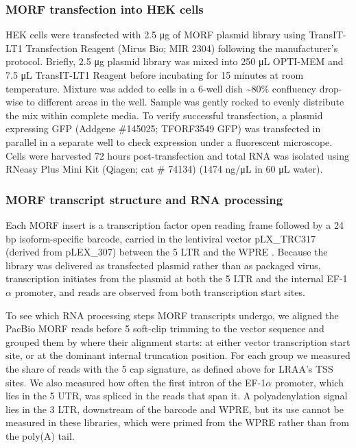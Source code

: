 \subsubsection{MORF transfection into HEK cells}\label{morf-transfection-into-hek-cells}

HEK cells were transfected with 2.5 μg of MORF plasmid library using TransIT-LT1 Transfection Reagent (Mirus Bio; MIR 2304) following the manufacturer's protocol. Briefly, 2.5 μg plasmid library was mixed into 250 μL OPTI-MEM and 7.5 μL TransIT-LT1 Reagent before incubating for 15 minutes at room temperature. Mixture was added to cells in a 6-well dish \textasciitilde80\% confluency drop-wise to different areas in the well. Sample was gently rocked to evenly distribute the mix within complete media. To verify successful transfection, a plasmid expressing GFP (Addgene \#145025; TFORF3549 GFP) was transfected in parallel in a separate well to check expression under a fluorescent microscope. Cells were harvested 72 hours post-transfection and total RNA was isolated using RNeasy Plus Mini Kit (Qiagen; cat \# 74134) (1474 ng/μL in 60 μL water).

\subsubsection{MORF transcript structure and RNA processing}\label{morf-transcript-structure-and-rna-processing}

Each MORF insert is a transcription factor open reading frame followed by a 24 bp isoform-specific barcode, carried in the lentiviral vector pLX\_TRC317 (derived from pLEX\_307) between the 5\p{} LTR and the WPRE \citep{joung2023}. Because the library was delivered as transfected plasmid rather than as packaged virus, transcription initiates from the plasmid at both the 5\p{} LTR and the internal EF-1$\alpha$ promoter, and reads are observed from both transcription start sites.

To see which RNA processing steps MORF transcripts undergo, we aligned the PacBio MORF reads before 5\p{} soft-clip trimming to the vector sequence and grouped them by where their alignment starts: at either vector transcription start site, or at the dominant internal truncation position. For each group we measured the share of reads with the 5\p{} cap signature, as defined above for LRAA's TSS sites. We also measured how often the first intron of the EF-1$\alpha$ promoter, which lies in the 5\p{} UTR, was spliced in the reads that span it. A polyadenylation signal lies in the 3\p{} LTR, downstream of the barcode and WPRE, but its use cannot be measured in these libraries, which were primed from the WPRE rather than from the poly(A) tail.

